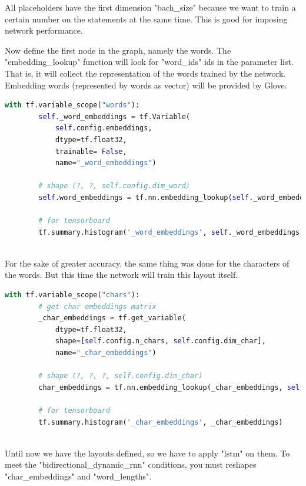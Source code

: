 All placeholders have the first dimension "bach\_size" because we want to train a certain number on the statements at the same time. This is good for imposing network performance.

Now define the first node in the graph, namely the words. The "embedding\_lookup" function will look for "word\_ids" ids in the parameter list. That is, it will collect the representation of the words trained by the network. Embedding words (represented by words as vector) will be provided by Glove.

\begin{lstlisting}[language=Python,caption={Add word embeddings}]
    with tf.variable_scope("words"):
        self._word_embeddings = tf.Variable(
            self.config.embeddings,
            dtype=tf.float32,
            trainable= False,
            name="_word_embeddings")

        # shape (?, ?, self.config.dim_word)
        self.word_embeddings = tf.nn.embedding_lookup(self._word_embeddings, self.word_ids, name="word_embeddings")

        # for tensorboard
        tf.summary.histogram('_word_embeddings', self._word_embeddings)
        
\end{lstlisting}

For the sake of greater accuracy, the same thing was done for the characters of the words. But this time the network will train this layout itself.

\begin{lstlisting}[language=Python,caption={Add char embeddings}]
    with tf.variable_scope("chars"):
        # get char embeddings matrix
        _char_embeddings = tf.get_variable(
            dtype=tf.float32,
            shape=[self.config.n_chars, self.config.dim_char],
            name="_char_embeddings")

        # shape (?, ?, ?, self.config.dim_char)
        char_embeddings = tf.nn.embedding_lookup(_char_embeddings, self.char_ids, name="char_embeddings")

        # for tensorboard
        tf.summary.histogram('_char_embeddings', _char_embeddings)
        
\end{lstlisting}

Until now we have the layouts defined, so we have to apply "lstm" on them. To meet the "bidirectional\_dynamic\_rnn" conditions, you must reshapes "char\_embeddings" and "word\_lengths".

